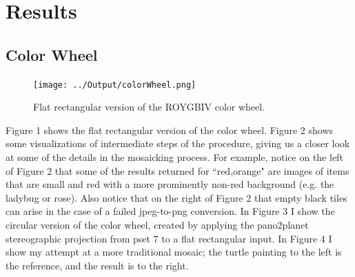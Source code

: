 \documentclass[letterpaper,12pt]{article}
\begin{document}
\section{Results} 

\subsection{Color Wheel}
\begin{figure}
	\centering
	\texttt{[image: ../Output/colorWheel.png]}
	\caption{Flat rectangular version of the ROYGBIV color wheel.}
\end{figure}
Figure 1 shows the flat rectangular version of the color wheel. Figure 2 shows some visualizations of intermediate steps of the procedure, giving us a closer look at some of the details in the mosaicking process. For example, notice on the left of Figure 2 that some of the results returned for ``red,orange" are images of items that are small and red with a more prominently non-red background (e.g. the ladybug or rose). Also notice that on the right of Figure 2 that empty black tiles can arise in the case of a failed jpeg-to-png conversion. In Figure 3 I show the circular version of the color wheel, created by applying the pano2planet stereographic projection from pset 7 to a flat rectangular input. In Figure 4 I show my attempt at a more traditional mosaic; the turtle painting to the left is the reference, and the result is to the right.
\end{document}
